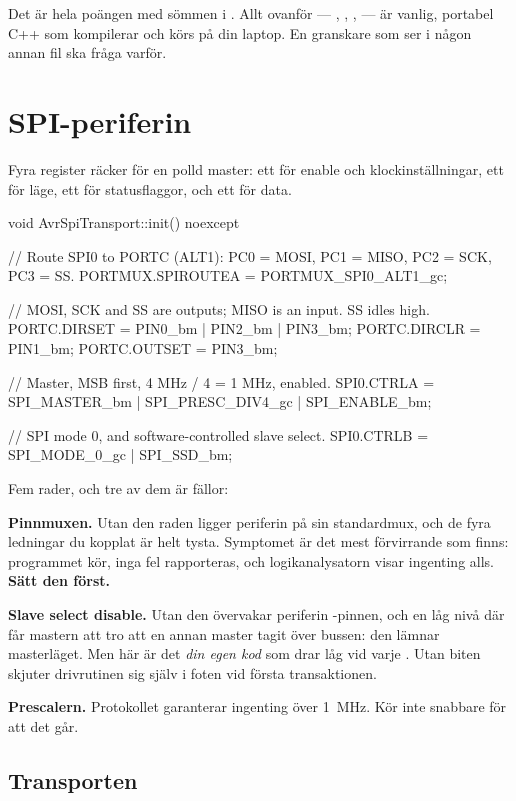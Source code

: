 Det är hela poängen med sömmen i . Allt ovanför --- , ,
,  --- är vanlig, portabel C++ som kompilerar och körs på din
laptop. En granskare som ser  i någon annan fil ska fråga varför.

\section{SPI-periferin}
\label{sec:periph}

Fyra register räcker för en polld master: ett för enable och klockinställningar, ett för läge, ett
för statusflaggor, och ett för data.

\begin{cppcode}
void AvrSpiTransport::init() noexcept
{
    // Route SPI0 to PORTC (ALT1): PC0 = MOSI, PC1 = MISO, PC2 = SCK, PC3 = SS.
    PORTMUX.SPIROUTEA = PORTMUX_SPI0_ALT1_gc;

    // MOSI, SCK and SS are outputs; MISO is an input. SS idles high.
    PORTC.DIRSET = PIN0_bm | PIN2_bm | PIN3_bm;
    PORTC.DIRCLR = PIN1_bm;
    PORTC.OUTSET = PIN3_bm;

    // Master, MSB first, 4 MHz / 4 = 1 MHz, enabled.
    SPI0.CTRLA = SPI_MASTER_bm | SPI_PRESC_DIV4_gc | SPI_ENABLE_bm;

    // SPI mode 0, and software-controlled slave select.
    SPI0.CTRLB = SPI_MODE_0_gc | SPI_SSD_bm;
}
\end{cppcode}

Fem rader, och tre av dem är fällor:

\textbf{Pinnmuxen.} Utan den raden ligger periferin på sin standardmux, och de fyra ledningar du
kopplat är helt tysta. Symptomet är det mest förvirrande som finns: programmet kör, inga fel
rapporteras, och logikanalysatorn visar ingenting alls. \textbf{Sätt den först.}

\textbf{Slave select disable.} Utan den övervakar periferin -pinnen, och en låg nivå där
får mastern att tro att en annan master tagit över bussen: den lämnar masterläget. Men här är det
\emph{din egen kod} som drar  låg vid varje . Utan biten skjuter
drivrutinen sig själv i foten vid första transaktionen.

\textbf{Prescalern.} Protokollet garanterar ingenting över 1~MHz. Kör inte snabbare för att det
går.



\subsection{Transporten}

